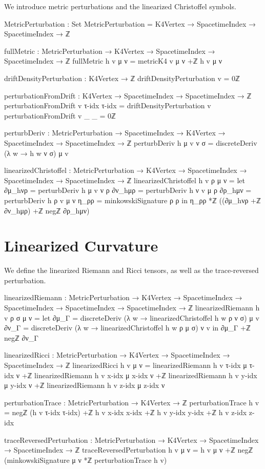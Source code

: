 \documentclass[11pt,a4paper]{book}
\begin{document}
We introduce metric perturbations and the linearized Christoffel symbols.

\begin{code}
MetricPerturbation : Set
MetricPerturbation = K4Vertex → SpacetimeIndex → SpacetimeIndex → ℤ

fullMetric : MetricPerturbation → K4Vertex → SpacetimeIndex → SpacetimeIndex → ℤ
fullMetric h v μ ν = metricK4 v μ ν +ℤ h v μ ν

driftDensityPerturbation : K4Vertex → ℤ
driftDensityPerturbation v = 0ℤ

perturbationFromDrift : K4Vertex → SpacetimeIndex → SpacetimeIndex → ℤ
perturbationFromDrift v τ-idx τ-idx = driftDensityPerturbation v
perturbationFromDrift v _     _     = 0ℤ

perturbDeriv : MetricPerturbation → SpacetimeIndex → K4Vertex → 
               SpacetimeIndex → SpacetimeIndex → ℤ
perturbDeriv h μ v ν σ = discreteDeriv (λ w → h w ν σ) μ v
\end{code}

\begin{code}
linearizedChristoffel : MetricPerturbation → K4Vertex → 
                        SpacetimeIndex → SpacetimeIndex → SpacetimeIndex → ℤ
linearizedChristoffel h v ρ μ ν = 
  let ∂μ_hνρ = perturbDeriv h μ v ν ρ
      ∂ν_hμρ = perturbDeriv h ν v μ ρ
      ∂ρ_hμν = perturbDeriv h ρ v μ ν
      η_ρρ = minkowskiSignature ρ ρ
  in η_ρρ *ℤ ((∂μ_hνρ +ℤ ∂ν_hμρ) +ℤ negℤ ∂ρ_hμν)
\end{code}

\section{Linearized Curvature}

We define the linearized Riemann and Ricci tensors, as well as the trace-reversed perturbation.

\begin{code}
linearizedRiemann : MetricPerturbation → K4Vertex → 
                    SpacetimeIndex → SpacetimeIndex → 
                    SpacetimeIndex → SpacetimeIndex → ℤ
linearizedRiemann h v ρ σ μ ν = 
  let ∂μ_Γ = discreteDeriv (λ w → linearizedChristoffel h w ρ ν σ) μ v
      ∂ν_Γ = discreteDeriv (λ w → linearizedChristoffel h w ρ μ σ) ν v
  in ∂μ_Γ +ℤ negℤ ∂ν_Γ

linearizedRicci : MetricPerturbation → K4Vertex → 
                  SpacetimeIndex → SpacetimeIndex → ℤ
linearizedRicci h v μ ν = 
  linearizedRiemann h v τ-idx μ τ-idx ν +ℤ
  linearizedRiemann h v x-idx μ x-idx ν +ℤ
  linearizedRiemann h v y-idx μ y-idx ν +ℤ
  linearizedRiemann h v z-idx μ z-idx ν

perturbationTrace : MetricPerturbation → K4Vertex → ℤ
perturbationTrace h v = 
  negℤ (h v τ-idx τ-idx) +ℤ
  h v x-idx x-idx +ℤ
  h v y-idx y-idx +ℤ
  h v z-idx z-idx

traceReversedPerturbation : MetricPerturbation → K4Vertex → 
                            SpacetimeIndex → SpacetimeIndex → ℤ
traceReversedPerturbation h v μ ν = 
  h v μ ν +ℤ negℤ (minkowskiSignature μ ν *ℤ perturbationTrace h v)
\end{code}
\end{document}
